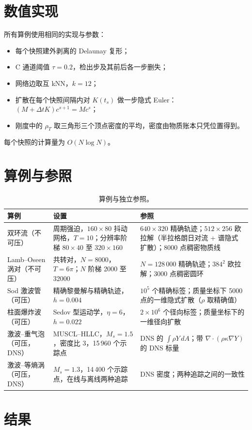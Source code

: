 \documentclass[10.5pt,a4paper]{article}
\begin{document}
\section{数值实现}
所有算例使用相同的实现与参数：
\begin{itemize}
\item 每个快照建外剥离的 Delaunay 复形；
\item C 通道阈值 $\tau=0.2$，检出步及其前后各一步删失；
\item 网络边取互 kNN，$k=12$；
\item 扩散在每个快照间隔内对 $K(t_s)$ 做一步隐式 Euler：$(M+\Delta tK)c^{s+1}=Mc^s$；
\item 刚度中的 $\rho_T$ 取三角形三个顶点密度的平均，密度由物质账本只凭位置得到。
\end{itemize}
每个快照的计算量为 $O(N\log N)$。

\section{算例与参照}
\begin{table}[H]\centering\small
\caption{算例与独立参照。}
\begin{tabularx}{\linewidth}{@{}lYY@{}}\toprule
算例 & 设置 & 参照 \\\midrule
双环流（不可压） & 周期强迫，$160\times80$ 抖动网格，$T=10$；分辨率阶梯 $80\times40$ 至 $320\times160$ & $640\times320$ 精确轨迹；$512\times256$ 欧拉解（半拉格朗日对流 + 谱隐式扩散）；8000 点稠密物质线 \\
Lamb–Oseen 涡对（不可压） & 共转对，$N=8000$，$T=6\pi$；$N$ 阶梯 2000 至 32000 & $N=128\,000$ 精确轨迹；$384^2$ 欧拉解；3000 点稠密圆环 \\
Sod 激波管（可压） & 精确黎曼解与精确轨迹，$h=0.004$ & $10^5$ 个精确标签；质量坐标下 5000 点的一维隐式扩散（$\rho$ 取精确值） \\
柱面爆炸波（可压） & Sedov 型运动学，$\eta=6$，$h=0.022$ & $2\times10^6$ 个径向标签；质量坐标下的一维径向扩散 \\
激波–重气泡（可压，DNS） & MUSCL–HLLC，$M_s=1.5$，密度比 3，15\,960 个示踪点 & DNS 的 $\int\rho Y\,dA$；带 $\nabla\!\cdot(\rho\kappa\nabla Y)$ 的 DNS 标量 \\
激波–等熵涡（可压，DNS） & $M_s=1.3$，14\,400 个示踪点，在线与离线两种追踪 & DNS 密度；两种追踪之间的一致性 \\
\bottomrule\end{tabularx}
\end{table}

\section{结果}\label{sec:results}
\end{document}
